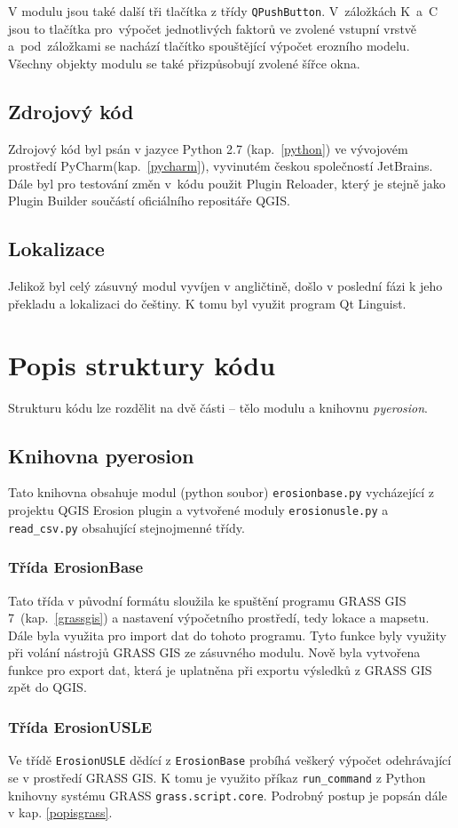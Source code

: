 V modulu jsou také další tři tlačítka z třídy \texttt{QPushButton}. 
V~záložkách K~a~C jsou to tlačítka pro~výpočet jednotlivých faktorů ve
zvolené vstupní vrstvě a~pod~záložkami se nachází tlačítko spouštějící
výpočet erozního modelu. Všechny objekty modulu se také přizpůsobují
zvolené šířce okna.
\subsection{Zdrojový kód} Zdrojový kód byl psán v jazyce Python
2.7 (kap.~\ref{python}) ve vývojovém prostředí PyCharm(kap.~\ref{pycharm}), vyvinutém
českou společností JetBrains. Dále byl pro testování změn v~kódu
použit Plugin Reloader, který je stejně jako Plugin Builder součástí
oficiálního repositáře QGIS.
\subsection{Lokalizace} Jelikož byl celý zásuvný modul vyvíjen v
angličtině, došlo v poslední fázi k jeho překladu a lokalizaci do
češtiny. K tomu byl využit program Qt Linguist.

\section{Popis struktury kódu} Strukturu kódu lze rozdělit na dvě
části – tělo modulu a knihovnu \textit{pyerosion}.
\subsection{Knihovna pyerosion} Tato knihovna obsahuje modul (python soubor)
\texttt{erosionbase.py} vycházející z projektu QGIS Erosion
plugin\cite{erosiongithub} a vytvořené moduly \texttt{erosionusle.py} a
\texttt{read\_csv.py} obsahující stejnojmenné třídy.
\subsubsection{Třída ErosionBase} Tato třída v původní formátu
sloužila ke spuštění programu GRASS GIS 7~(kap.~\ref{grassgis}) a
nastavení výpočetního prostředí, tedy lokace a mapsetu. Dále byla
využita pro import dat do tohoto programu. Tyto funkce byly využity
při volání nástrojů GRASS GIS ze zásuvného modulu. Nově byla vytvořena
funkce pro export dat, která je uplatněna při exportu výsledků z GRASS
GIS zpět do QGIS.
\subsubsection{Třída ErosionUSLE} Ve třídě \texttt{ErosionUSLE} dědící
z \texttt{ErosionBase} probíhá veškerý výpočet odehrávající se v
prostředí GRASS GIS. K tomu je využito příkaz \texttt{run\_command} z
Python knihovny systému GRASS \texttt{grass.script.core}. Podrobný
postup je popsán dále v kap. \ref{popisgrass}.

